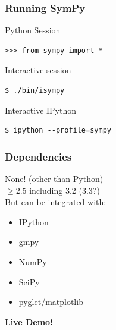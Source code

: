 \documentclass{beamer}
\begin{document}
\begin{frame}[fragile]
  \frametitle{Running SymPy}
  Python Session
  \begin{exampleblock}{}
    \begin{verbatim}>>> from sympy import *\end{verbatim}
  \end{exampleblock}
  Interactive session
  \begin{exampleblock}{}
    \begin{verbatim}$ ./bin/isympy\end{verbatim}
  \end{exampleblock}
  Interactive IPython
  \begin{exampleblock}{}
    \begin{verbatim}$ ipython --profile=sympy\end{verbatim}
  \end{exampleblock}
\end{frame}

\begin{frame}
  \frametitle{Dependencies}
  None! (other than Python) \\
  $\geq2.5$ including 3.2 (3.3?)\\[.3in]

  But can be integrated with:
  \begin{itemize}
    \item IPython
    \item gmpy
    \item NumPy
    \item SciPy
    \item pyglet/matplotlib
  \end{itemize}
\end{frame}

\begin{frame}
\hfill \bfseries{\LARGE Live Demo!}\hfill\phantom{}
\end{frame}
\end{document}
